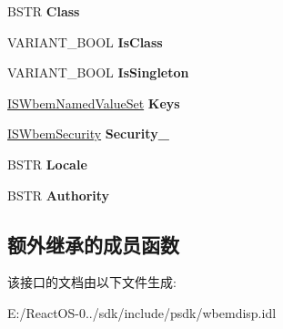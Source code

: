 \begin{DoxyCompactItemize}
B\+S\+TR {\bfseries Class}
\item 
\mbox{\label{interface_wbem_scripting_1_1_i_s_wbem_object_path_adc29f61dec69c8e0e48c7b1811120b83}} 
V\+A\+R\+I\+A\+N\+T\+\_\+\+B\+O\+OL {\bfseries Is\+Class}
\item 
\mbox{\label{interface_wbem_scripting_1_1_i_s_wbem_object_path_aa5b8c7ff58de1eec3ff0322dc33513f5}} 
V\+A\+R\+I\+A\+N\+T\+\_\+\+B\+O\+OL {\bfseries Is\+Singleton}
\item 
\mbox{\label{interface_wbem_scripting_1_1_i_s_wbem_object_path_a7455efe28beada1a9448b8821e2b9d6d}} 
\hyperlink{interface_wbem_scripting_1_1_i_s_wbem_named_value_set}{I\+S\+Wbem\+Named\+Value\+Set} {\bfseries Keys}
\item 
\mbox{\label{interface_wbem_scripting_1_1_i_s_wbem_object_path_ac303cb00c33221422bd36b250e4f394e}} 
\hyperlink{interface_wbem_scripting_1_1_i_s_wbem_security}{I\+S\+Wbem\+Security} {\bfseries Security\+\_\+}
\item 
\mbox{\label{interface_wbem_scripting_1_1_i_s_wbem_object_path_a732796bfe087061c3c77812b9c47363e}} 
B\+S\+TR {\bfseries Locale}
\item 
\mbox{\label{interface_wbem_scripting_1_1_i_s_wbem_object_path_a4de733681919e356a24dac9cddda8595}} 
B\+S\+TR {\bfseries Authority}
\end{DoxyCompactItemize}
\subsection*{额外继承的成员函数}


该接口的文档由以下文件生成\+:\begin{DoxyCompactItemize}
\item 
E\+:/\+React\+O\+S-\/0../sdk/include/psdk/wbemdisp.\+idl\end{DoxyCompactItemize}
